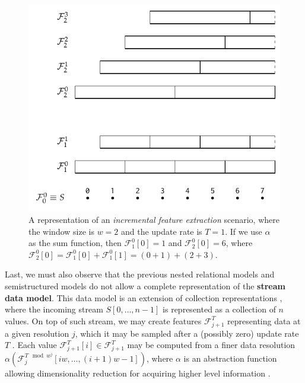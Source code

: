 \begin{figure}
	\centering
	\includegraphics[scale=0.7]{fig/02models/06stream}
	\caption{A representation of an \textit{incremental feature extraction} scenario, where the window size is $w=2$ and the update rate is $T=1$. If we use $\alpha$ as the sum function, then $\mathcal{F}_1^0[0]=1$ and $\mathcal{F}_2^0[0]=6$, where $\mathcal{F}_2^0[0]=\mathcal{F}_1^0[0]+\mathcal{F}_1^0[1]=(0+1)+(2+3)$.}\label{fig:stream}
\end{figure}
Last, we must also observe that the previous nested relational models and semistructured models do not allow a complete representation of the \textbf{stream data model}. This data model is an extension of collection representations \cite{LawWZ04,ArasuW04}, where the  incoming stream $S[0,\dots,n-1]$ is represented as a collection of $n$ values. On top of such stream, we may create features $\mathcal{F}_{j+1}^T$ representing data at a given resolution $j$, which it may be sampled after a (possibly zero) update rate $T$ \cite{BulutS07}. Each value  $\mathcal{F}_{j+1}^T[i]\in \mathcal{F}_{j+1}^T$ may be computed from a finer data resolution $\alpha(\mathcal{F}_{j}^{T\mod{w^j}}[iw,\dots,(i+1)w-1])$, where $\alpha$ is an abstraction function \cite{Johnson2011} allowing dimensionality reduction for acquiring higher level information \cite{BulutS07}. 

